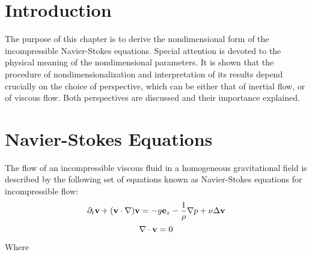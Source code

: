 
\providecommand{\divergenceNondim}{\nabla^{\prime}\cdot}

\providecommand{\velocityNondim}{\mathbf{v^{\prime}}}

\providecommand{\substDerivVelNondim}{\frac{D\velocity^{\prime}}{dt^{\prime}}}
\providecommand{\partialTimeVelNondim}{\partial_{t^{\prime}}\velocity^{\prime}}
\providecommand{\inertTermVelNondim}{(\velocity^{\prime} \cdot \nabla^{\prime})\velocity^{\prime}}

\providecommand{\velocityPressureTensorNondim}{\partial_k^{\prime}v^{l \prime}\partial_k^{\prime}v^{l \prime}}

\providecommand{\pressGradNondim}{\nabla^{\prime} p^{\prime}}
\providecommand{\pressLaplacianNondim}{\Delta^{\prime} p^{\prime}}
\providecommand{\laplacianVelNondim}{\Delta^{\prime}\velocity^{\prime}}


\section{Introduction}

The purpose of this chapter is to derive the nondimensional form of the incompressible Navier-Stokes equations. Special attention is devoted to the physical meaning of the nondimensional parameters. It is shown that the procedure of nondimensionalization and interpretation of its results depend crucially on the choice of perspective, which can be either that of inertial flow, or of viscous flow. Both perspectives are discussed and their importance explained. 

\section{Navier-Stokes Equations}

The flow of an incompressible viscous fluid in a homogeneous gravitational field is described by the following set of equations known as Navier-Stokes equations for incompressible flow\cite{gratz}:
\begin{equation} \label{NS1}
\partial_t\mathbf{v} + (\mathbf{v} \cdot \nabla)\mathbf{v} = -g\mathbf{e}_z - \frac{1}{\rho}\nabla p + \nu\Delta\mathbf{v} 
\end{equation}
\begin{equation} \label{NS2}
\nabla\cdot\mathbf{v} = 0  
\end{equation}

Where


